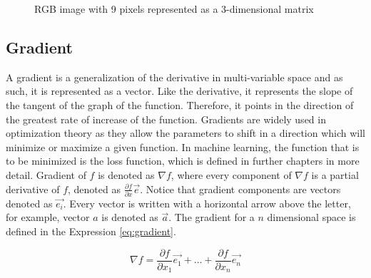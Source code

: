 \documentclass[times, utf8, diplomski]{fer}
\begin{document}
\begin{figure}
\centering
{}
\caption{RGB image with 9 pixels  represented as a 3-dimensional matrix}
\label{fig:image_matrix}
\end{figure}

\subsection{Gradient}
\label{se:gradient}
A gradient is a generalization of the derivative in multi-variable space and as such, it is represented as a vector. Like the derivative, it represents the slope of the tangent of the graph of the function. Therefore, it points in the direction of the greatest rate of increase of the function. Gradients are widely used in optimization theory as they allow the parameters to shift in a direction which will minimize or maximize a given function. In machine learning, the function that is to be minimized is the loss function, which is defined in further chapters in more detail. Gradient of $f$ is denoted as $\nabla{f}$, where every component of $\nabla{f}$ is a partial derivative of $f$, denoted as $\frac{\partial{f}}{\partial{x}}\vec{e}$. Notice that gradient components are vectors denoted as $\vec{e_i}$. Every vector is written with a horizontal arrow above the letter, for example, vector $a$ is denoted as $\vec{a}$. The gradient for a $n$ dimensional space is defined in the Expression \ref{eq:gradient}.


\begin{equation} \label{eq:gradient}
    \nabla{f}= \frac{\partial{f}}{\partial{x_{1}}}\vec{e_1} + \hdots +        \frac{\partial{f}}{\partial{x_{n}}}\vec{e_n}
\end{equation}
\end{document}

